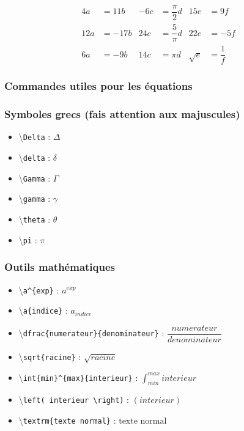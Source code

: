 \documentclass[a4paper, 10pt]{article}
\newcommand{\command}[1]{
	\colorbox{codebackground}{\scriptsize{\textbackslash}\texttt{#1}}
}
\begin{document}
\begin{align}
	4a  &= 11b  & -6c  &= \dfrac{\pi}{2}d & 15e      &= 9f \\
	12a &= -17b & 24c  &= \dfrac{5}{\pi}d & 22e      &= -5f \\
	6a  &= -9b  & 14c  &= \pi d           & \sqrt{e} &= \dfrac{1}{f}
\end{align}

\subsubsection{Commandes utiles pour les équations}

\subsubsection{Symboles grecs (fais attention aux majuscules)}

\begin{itemize}
	\item \command{Delta}: $\Delta$
	\item \command{delta}: $\delta$
	\item \command{Gamma}: $\Gamma$
	\item \command{gamma}: $\gamma$
	\item \command{theta}: $\theta$
	\item \command{pi}   : $\pi$
\end{itemize}

\subsubsection{Outils mathématiques}

\begin{itemize}
	\item \command{a\textasciicircum\{exp\}}:
			$a^{exp}$
	\item \command{a\textunderscore\{indice\}}:
			$a_{indice}$
	\item \command{dfrac\{numerateur\}\{denominateur\}}:
			$\dfrac{numerateur}{denominateur}$
	\item \command{sqrt\{racine\}}:
			$\sqrt{racine}$
	\item \command{int\textunderscore\{min\}\textasciicircum\{max\}\{interieur\}}:
			$\int_{min}^{max}{interieur}$
	\item \command{left( interieur \textbackslash right)}:
			$\left(interieur\right)$
	\item \command{textrm\{texte normal\}}:
			$\textrm{texte normal}$
\end{itemize}
\end{document}
